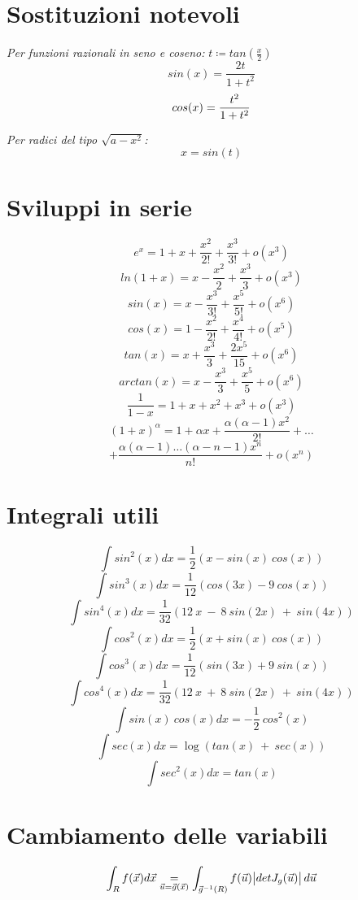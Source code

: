 \documentclass[a4paper,portrait,columns=3,5pt]{cheatsheet}
\begin{document}
\section{Sostituzioni notevoli}
\textit{Per funzioni razionali in seno e coseno:} $t \coloneqq tan(\frac{x}{2}) $
$$ sin(x) = \frac{2t}{1+t^2}$$
$$ cos(x) = \frac{\-t^2}{1+t^2}$$

\textit{Per radici del tipo $\sqrt{a - x^2}$:}
$$ x = sin(t) $$

\section{Sviluppi in serie}
$$ e^x = 1 + x + \frac{x^2}{2!} + \frac{x^3}{3!} + o(x^3)$$
$$ ln(1 + x) = x - \frac{x^2}{2} + \frac{x^3}{3} + o(x^3)$$
$$ sin(x) = x - \frac{x^3}{3!} + \frac{x^5}{5!} + o(x^6)$$
$$ cos(x) = 1 - \frac{x^2}{2!} + \frac{x^4}{4!} + o(x^5)$$
$$ tan(x) = x + \frac{x^3}{3} + \frac{2x^5}{15} + o(x^6)$$
$$ arctan(x) = x - \frac{x^3}{3} + \frac{x^5}{5} + o(x^6)$$
$$ \frac{1}{1-x} = 1 + x + x^2 + x^3 + o(x^3)$$
$$(1 + x) ^ \alpha = 1 + \alpha x + \frac{\alpha (\alpha - 1)x^2}{2!} + \dots $$
$$ + \frac{\alpha(\alpha - 1)\dots (\alpha - n - 1) x^n}{n!} + o(x^n) $$

\section{Integrali utili}
$$ \int sin^2(x) dx = \frac{1}{2} (x - sin(x)~cos(x)) $$
$$ \int sin^3(x) dx = \frac{1}{12} (cos(3x)-9~cos(x)) $$
$$ \int sin^4(x) dx = \frac{1}{32} (12~x ~-~ 8~sin(2x)~+~sin(4x)) $$
$$ \int cos^2(x) dx = \frac{1}{2} (x + sin(x)~cos(x)) $$
$$ \int cos^3(x) dx = \frac{1}{12} (sin(3x) + 9~sin(x))$$
$$ \int cos^4(x) dx = \frac{1}{32} (12~x ~+~ 8~sin(2x)~+~sin(4x))$$
$$ \int sin(x) ~ cos(x) dx = -\frac{1}{2}~cos^2(x) $$ 
$$ \int sec(x) dx = \log (tan(x)~+~sec(x)) $$
$$ \int sec^2(x) dx = tan(x) $$
\section{Cambiamento delle variabili}
\begin{equation*}
	\int_R f(\vec {x}) d\vec{x} \underset{{\vec{u} = \vec{g} (\vec{x})}}{=} \int_{\vec{g}^{-1}(R)} f(\vec {u}) \abs{det J_g(\vec u)} d\vec{u}
\end{equation*}
\end{document}
